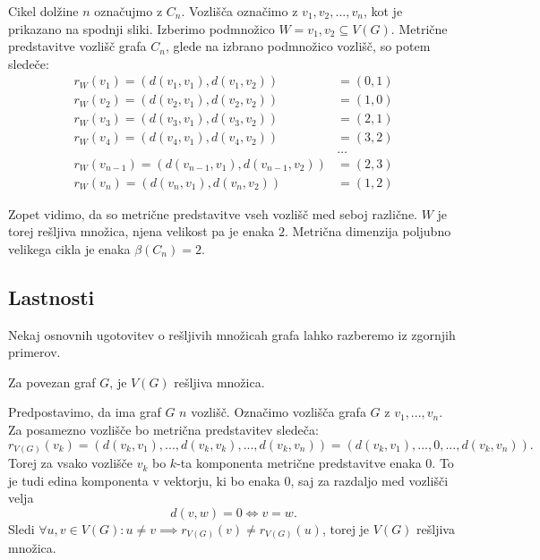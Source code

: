 \documentclass[mat1, tisk]{fmfdelo}
\begin{document}
\begin{primer}\label{primer_2.5.}
    Cikel dolžine $n$ označujmo z $C_n$. Vozlišča označimo z $v_1, v_2, ..., v_n$, kot 
    je prikazano na spodnji sliki. Izberimo podmnožico $W = {v_1, v_2} \subseteq V(G).$ 
    Metrične predstavitve vozlišč grafa $C_n$, glede na izbrano podmnožico vozlišč, so potem sledeče:
    \begin{align*}
        r_W(v_1) = (d(v_1, v_1), d(v_1, v_2)) & = (0, 1) \\
        r_W(v_2) = (d(v_2, v_1), d(v_2, v_2)) & = (1, 0) \\
        r_W(v_3) = (d(v_3, v_1), d(v_3, v_2)) & = (2, 1) \\
        r_W(v_4) = (d(v_4, v_1), d(v_4, v_2)) & = (3, 2) \\
        & \dots \\
        r_W(v_{n-1}) = (d(v_{n-1}, v_1), d(v_{n-1}, v_2)) & = (2, 3) \\
        r_W(v_n) = (d(v_n, v_1), d(v_n, v_2)) & = (1, 2)
    \end{align*}
    
    Zopet vidimo, da so metrične predstavitve vseh vozlišč med seboj različne.
    $W$  je torej rešljiva množica, njena velikost pa je enaka $2$. Metrična dimenzija
    poljubno velikega cikla je enaka $\beta(C_n) = 2.$
\end{primer}

\subsection{Lastnosti}

Nekaj osnovnih ugotovitev o rešljivih množicah grafa lahko razberemo iz zgornjih primerov.

\begin{trditev}
Za povezan graf $G$, je $V(G)$ rešljiva množica.
\end{trditev}
\begin{dokaz}
Predpostavimo, da ima graf $G$ $n$ vozlišč. Označimo vozlišča grafa $G$ z $v_1, ..., v_n$.
Za posamezno vozlišče bo metrična predstavitev sledeča:
$$r_{V(G)}(v_k) = (d(v_k, v_1), ..., d(v_k, v_k), ... , d(v_k, v_n)) = (d(v_k, v_1), ..., 0 , ... , d(v_k, v_n)).$$
Torej za vsako vozlišče $v_k$ bo $k$-ta komponenta metrične predstavitve enaka $0$. To je tudi edina komponenta v vektorju, 
ki bo enaka $0$, saj za razdaljo med vozlišči velja
$$d(v, w) = 0 \Leftrightarrow v = w.$$
Sledi $\forall u, v \in V(G): u \neq v \implies r_{V(G)}(v) \neq r_{V(G)}(u)$, torej je $V(G)$ rešljiva množica.
\end{dokaz}
\end{document}
